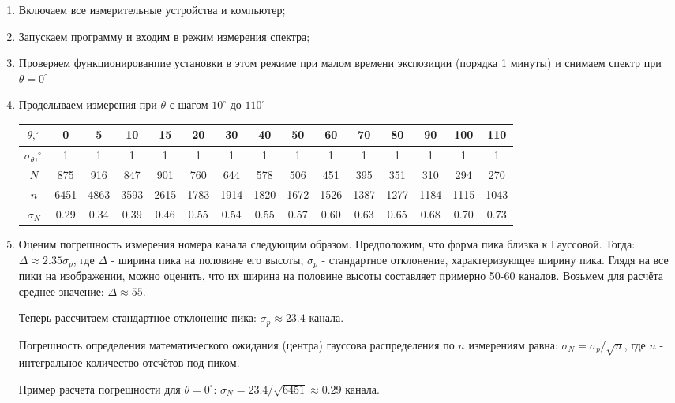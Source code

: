 \documentclass[a4paper,12pt]{article}
\begin{document}
\begin{enumerate}
    \item Включаем все измерительные устройства и компьютер;
    \item Запускаем программу и входим в режим измерения спектра;
    \item Проверяем функционированпие установки в этом режиме при малом времени экспозиции (порядка 1 минуты) и снимаем спектр при $\theta=0^\circ$
    \item Проделываем измерения при $\theta$ с шагом $10^\circ$ до $110^\circ$
    \begin{table}[h!]
    \centering
    \begin{tabular}{||c||c|c|c|c|c|c|c|c|c|c|c|c|c|c||}
    \hline
    $\theta, ^\circ$ & 0 & 5 & 10 & 15 & 20 & 30 & 40 & 50 & 60 & 70 & 80 & 90 & 100 & 110 \\
    \hline
    $\sigma_\theta, ^\circ$ & 1 & 1 & 1 & 1 & 1 & 1 & 1 & 1 & 1 & 1 & 1 & 1 & 1 & 1 \\
    \hline
    $N$ & 875 & 916 & 847 & 901 & 760 & 644 & 578 & 506 & 451 & 395 & 351 & 310 & 294 & 270 \\
    \hline 
    $n$ & 6451 & 4863 & 3593 & 2615 & 1783 & 1914 & 1820 & 1672 & 1526 & 1387 & 1277 & 1184 & 1115 & 1043 \\
    \hline
    $\sigma_N$ & 0.29 & 0.34 & 0.39 & 0.46 & 0.55 & 0.54 & 0.55 & 0.57 & 0.60 & 0.63 & 0.65 & 0.68 & 0.70 & 0.73 \\
    \hline
    \end{tabular}
    \end{table}

    \item Оценим погрешность измерения номера канала следующим образом. Предположим, что форма пика близка к Гауссовой. Тогда: $\Delta \approx 2.35 \sigma_p$, где $\Delta$ - ширина пика на половине его высоты, $\sigma_p$ - стандартное отклонение, характеризующее ширину пика. Глядя на все пики на изображении, можно оценить, что их ширина на половине высоты составляет примерно 50-60 каналов. Возьмем для расчёта среднее значение: $\Delta\approx55$.

    Теперь рассчитаем стандартное отклонение пика: $\sigma_p \approx 23.4$ канала. 

    Погрешность определения математического ожидания (центра) гауссова распределения по $n$ измерениям равна: $\sigma_N = \sigma_p / \sqrt{n}$, где $n$ - интегральное количество отсчётов под пиком.

    Пример расчета погрешности для $\theta=0^\circ$: $\sigma_N = 23.4 /\sqrt{6451} \approx 0.29$ канала.
    


\end{enumerate}
\end{document}
